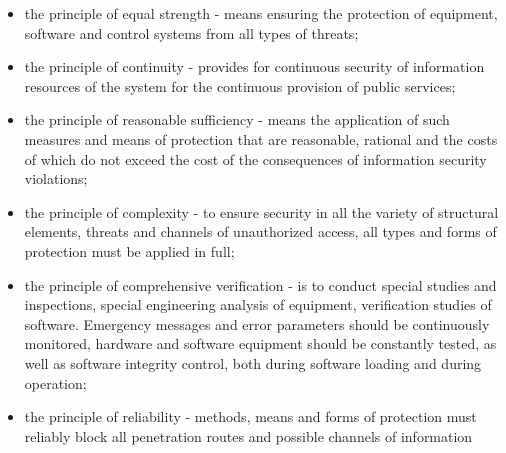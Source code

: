 \documentclass{article}
\begin{document}
\begin{multicols}{2}
\begin{itemize}
    \item the principle of equal strength - means ensuring
the protection of equipment, software and control
systems from all types of threats;
    \item the principle of continuity - provides for continuous
security of information resources of the system for
the continuous provision of public services;
    \item the principle of reasonable sufficiency - means the
application of such measures and means of protection
that are reasonable, rational and the costs of which
do not exceed the cost of the consequences of
information security violations;
    \item the principle of complexity - to ensure security in
all the variety of structural elements, threats and
channels of unauthorized access, all types and forms
of protection must be applied in full;
    \item the principle of comprehensive verification - is to
conduct special studies and inspections, special engineering analysis of equipment, verification studies of
software. Emergency messages and error parameters
should be continuously monitored, hardware and
software equipment should be constantly tested,
as well as software integrity control, both during
software loading and during operation;
    \item the principle of reliability - methods, means and
forms of protection must reliably block all penetration routes and possible channels of information
\end{itemize}

\end{multicols}
\end{document}
